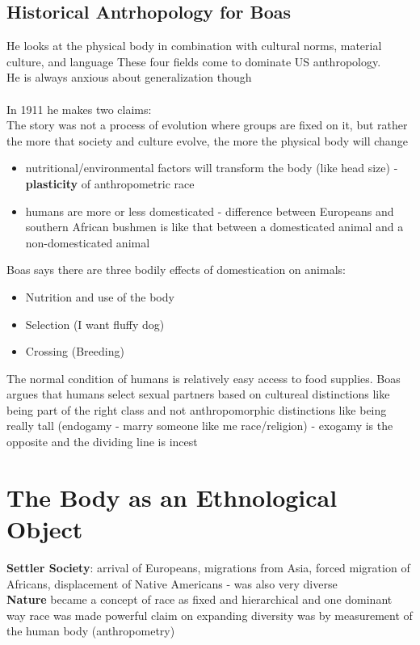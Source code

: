 \documentclass{article}
\begin{document}
\subsection{Historical Antrhopology for Boas}
He looks at the physical body in combination with cultural norms, material culture, and language These four fields come to dominate US anthropology. \\ He is always anxious about generalization though \\ \\
In 1911 he makes two claims: \\ 
The story was not a process of evolution where groups are fixed on it, but rather the more that society and culture evolve, the more the physical body will change
\begin{itemize}
\item nutritional/environmental factors will transform the body (like head size) - \textbf{plasticity} of anthropometric race
\item humans are more or less domesticated - difference between Europeans and southern African bushmen is like that between a domesticated animal and a non-domesticated animal 
\end{itemize}
Boas says there are three bodily effects of domestication on animals:
\begin{itemize}
\item Nutrition and use of the body
\item Selection (I want fluffy dog)
\item Crossing (Breeding)
\end{itemize}
The normal condition of humans is relatively easy access to food supplies. Boas argues that humans select sexual partners based on cultureal distinctions like being part of the right class and not anthropomorphic distinctions like being really tall (endogamy - marry someone like me race/religion) - exogamy is the opposite and the dividing line is incest

\section{The Body as an Ethnological Object}
\textbf{Settler Society}: arrival of Europeans, migrations from Asia, forced migration of Africans, displacement of Native Americans - was also very diverse \\
\textbf{Nature} became a concept of race as fixed and hierarchical and one dominant way race was made powerful claim on expanding diversity was by measurement of the human body (anthropometry)
\end{document}
